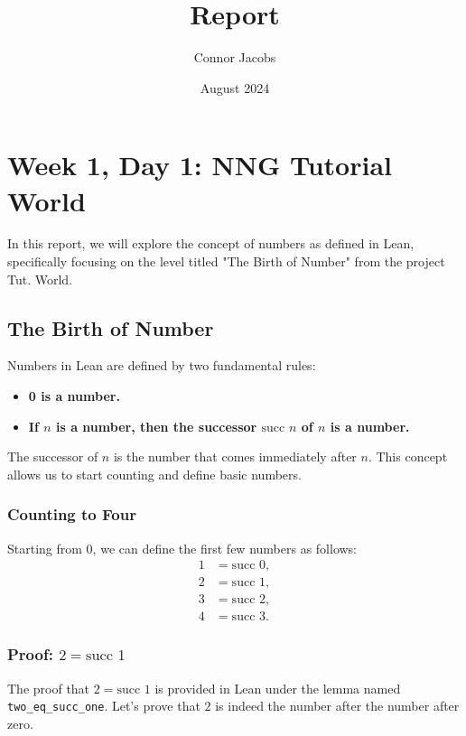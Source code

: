 \documentclass{article}
\title{Report}
\author{Connor Jacobs}
\date{August 2024}
\begin{document}
\maketitle

\newpage
\tableofcontents %

\newpage
\section{Week 1, Day 1: NNG Tutorial World}
In this report, we will explore the concept of numbers as defined in Lean, specifically focusing on the level titled "The Birth of Number" from the project Tut. World.

\subsection{The Birth of Number}
Numbers in Lean are defined by two fundamental rules:
\begin{itemize}
    \item \textbf{0 is a number.}
    \item \textbf{If \( n \) is a number, then the successor \( \text{succ } n \) of \( n \) is a number.}
\end{itemize}

The successor of \( n \) is the number that comes immediately after \( n \). This concept allows us to start counting and define basic numbers.

\subsubsection{Counting to Four}
Starting from \( 0 \), we can define the first few numbers as follows:
\begin{align*}
    1 &= \text{succ } 0, \\
    2 &= \text{succ } 1, \\
    3 &= \text{succ } 2, \\
    4 &= \text{succ } 3.
\end{align*}

\subsubsection{Proof: \( 2 = \text{succ } 1 \)}
The proof that \( 2 = \text{succ } 1 \) is provided in Lean under the lemma named \texttt{two\_eq\_succ\_one}. Let's prove that \( 2 \) is indeed the number after the number after zero.
\end{document}
